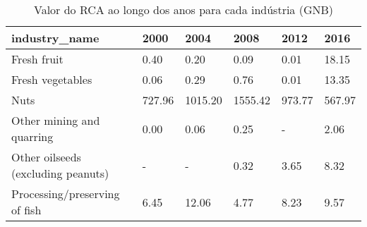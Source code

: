 \begin{table}
\centering
\caption{Valor do RCA ao longo dos anos para cada indústria (GNB)}
\begin{tabular}{p{6cm}p{1.5cm}p{1.5cm}p{1.5cm}p{1.5cm}p{1.5cm}}
\toprule
                     industry\_name &   2000 &    2004 &    2008 &   2012 &   2016 \\
\midrule
                       Fresh fruit &   0.40 &    0.20 &    0.09 &   0.01 &  18.15 \\
                  Fresh vegetables &   0.06 &    0.29 &    0.76 &   0.01 &  13.35 \\
                              Nuts & 727.96 & 1015.20 & 1555.42 & 973.77 & 567.97 \\
         Other mining and quarring &   0.00 &    0.06 &    0.25 &      - &   2.06 \\
Other oilseeds (excluding peanuts) &      - &       - &    0.32 &   3.65 &   8.32 \\
     Processing/preserving of fish &   6.45 &   12.06 &    4.77 &   8.23 &   9.57 \\
\bottomrule
\end{tabular}
\end{table}
